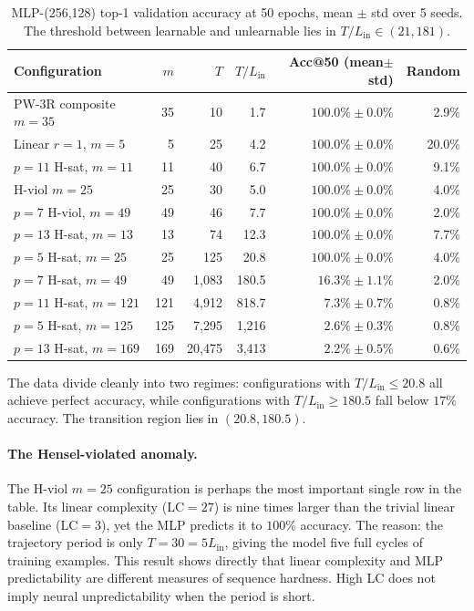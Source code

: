 \documentclass[11pt]{article}
\theoremstyle{plain}
\theoremstyle{definition}
\newcommand{\LC}{\mathrm{LC}}
\begin{document}
\begin{table}[ht]
\centering
\caption{MLP-(256,128) top-1 validation accuracy at 50 epochs, mean $\pm$ std over 5 seeds. The threshold between learnable and unlearnable lies in $T/L_{\mathrm{in}} \in (21, 181)$.}
\label{tab:neural}
\medskip
\begin{tabular}{@{}lrrrrr@{}}
\toprule
Configuration & $m$ & $T$ & $T/L_{\mathrm{in}}$ & Acc@50 (mean$\pm$std) & Random\\
\midrule
PW-3R composite $m=35$       & 35  & 10           & 1.7    & $100.0\% \pm 0.0\%$ & 2.9\%\\
Linear $r=1$, $m=5$          & 5   & 25           & 4.2    & $100.0\% \pm 0.0\%$ & 20.0\%\\
$p=11$ H-sat, $m=11$         & 11  & 40           & 6.7    & $100.0\% \pm 0.0\%$ & 9.1\%\\
H-viol $m=25$                & 25  & 30           & 5.0    & $100.0\% \pm 0.0\%$ & 4.0\%\\
$p=7$ H-viol, $m=49$         & 49  & 46           & 7.7    & $100.0\% \pm 0.0\%$ & 2.0\%\\
$p=13$ H-sat, $m=13$         & 13  & 74           & 12.3   & $100.0\% \pm 0.0\%$ & 7.7\%\\
$p=5$ H-sat, $m=25$          & 25  & 125          & 20.8   & $100.0\% \pm 0.0\%$ & 4.0\%\\
\midrule
$p=7$ H-sat, $m=49$          & 49  & 1{,}083       & 180.5  & $16.3\% \pm 1.1\%$  & 2.0\%\\
$p=11$ H-sat, $m=121$        & 121 & 4{,}912       & 818.7  & $7.3\% \pm 0.7\%$   & 0.8\%\\
$p=5$ H-sat, $m=125$         & 125 & 7{,}295       & 1{,}216 & $2.6\% \pm 0.3\%$   & 0.8\%\\
$p=13$ H-sat, $m=169$        & 169 & 20{,}475      & 3{,}413 & $2.2\% \pm 0.5\%$   & 0.6\%\\
\bottomrule
\end{tabular}
\end{table}

The data divide cleanly into two regimes: configurations with $T/L_{\mathrm{in}} \leq 20.8$ all achieve perfect accuracy, while configurations with $T/L_{\mathrm{in}} \geq 180.5$ fall below $17\%$ accuracy. The transition region lies in $(20.8, 180.5)$.

\paragraph{The Hensel-violated anomaly.} The H-viol $m=25$ configuration is perhaps the most important single row in the table. Its linear complexity ($\LC = 27$) is nine times larger than the trivial linear baseline ($\LC = 3$), yet the MLP predicts it to $100\%$ accuracy. The reason: the trajectory period is only $T = 30 = 5 L_{\mathrm{in}}$, giving the model five full cycles of training examples. This result shows directly that linear complexity and MLP predictability are different measures of sequence hardness. High LC does not imply neural unpredictability when the period is short.
\end{document}
